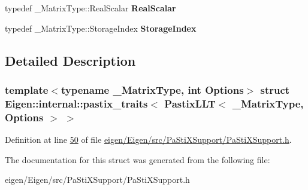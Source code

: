 \begin{DoxyCompactItemize}
\mbox{\label{struct_eigen_1_1internal_1_1pastix__traits_3_01_pastix_l_l_t_3_01___matrix_type_00_01_options_01_4_01_4_a15a2ad1b048090501c159dfe49af97ec}} 
typedef \+\_\+\+Matrix\+Type\+::\+Real\+Scalar {\bfseries Real\+Scalar}
\item 
\mbox{\label{struct_eigen_1_1internal_1_1pastix__traits_3_01_pastix_l_l_t_3_01___matrix_type_00_01_options_01_4_01_4_a043abc9c458ee20bdf7df674eab32200}} 
typedef \+\_\+\+Matrix\+Type\+::\+Storage\+Index {\bfseries Storage\+Index}
\end{DoxyCompactItemize}


\subsection{Detailed Description}
\subsubsection*{template$<$typename \+\_\+\+Matrix\+Type, int Options$>$\newline
struct Eigen\+::internal\+::pastix\+\_\+traits$<$ Pastix\+L\+L\+T$<$ \+\_\+\+Matrix\+Type, Options $>$ $>$}



Definition at line \hyperlink{eigen_2_eigen_2src_2_pa_sti_x_support_2_pa_sti_x_support_8h_source_l00050}{50} of file \hyperlink{eigen_2_eigen_2src_2_pa_sti_x_support_2_pa_sti_x_support_8h_source}{eigen/\+Eigen/src/\+Pa\+Sti\+X\+Support/\+Pa\+Sti\+X\+Support.\+h}.



The documentation for this struct was generated from the following file\+:\begin{DoxyCompactItemize}
\item 
eigen/\+Eigen/src/\+Pa\+Sti\+X\+Support/\+Pa\+Sti\+X\+Support.\+h\end{DoxyCompactItemize}
